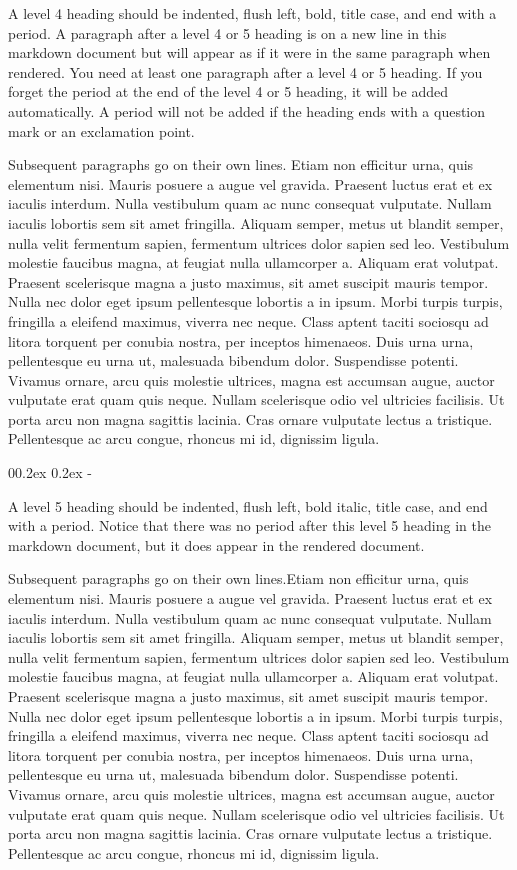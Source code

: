 \documentclass[
  man,
  floatsintext,
  longtable,
  nolmodern,
  notxfonts,
  notimes,
  mask,
  colorlinks=true,linkcolor=blue,citecolor=blue,urlcolor=blue]{apa7}
\makeatletter
\renewcommand{\subparagraph}[1]{\@startsection{subparagraph}{5}{0.5em}%
	{0\baselineskip \@plus 0.2ex \@minus 0.2ex}%
	{-\z@\relax}%
	{\normalfont\normalsize\bfseries\itshape\hspace{\parindent}{#1}\textit{\addperi}}{\relax}}
\makeatother
\begin{document}
A level 4 heading should be indented, flush left, bold, title case, and
end with a period. A paragraph after a level 4 or 5 heading is on a new
line in this markdown document but will appear as if it were in the same
paragraph when rendered. You need at least one paragraph after a level 4
or 5 heading. If you forget the period at the end of the level 4 or 5
heading, it will be added automatically. A period will not be added if
the heading ends with a question mark or an exclamation point.

Subsequent paragraphs go on their own lines. Etiam non efficitur urna,
quis elementum nisi. Mauris posuere a augue vel gravida. Praesent luctus
erat et ex iaculis interdum. Nulla vestibulum quam ac nunc consequat
vulputate. Nullam iaculis lobortis sem sit amet fringilla. Aliquam
semper, metus ut blandit semper, nulla velit fermentum sapien, fermentum
ultrices dolor sapien sed leo. Vestibulum molestie faucibus magna, at
feugiat nulla ullamcorper a. Aliquam erat volutpat. Praesent scelerisque
magna a justo maximus, sit amet suscipit mauris tempor. Nulla nec dolor
eget ipsum pellentesque lobortis a in ipsum. Morbi turpis turpis,
fringilla a eleifend maximus, viverra nec neque. Class aptent taciti
sociosqu ad litora torquent per conubia nostra, per inceptos himenaeos.
Duis urna urna, pellentesque eu urna ut, malesuada bibendum dolor.
Suspendisse potenti. Vivamus ornare, arcu quis molestie ultrices, magna
est accumsan augue, auctor vulputate erat quam quis neque. Nullam
scelerisque odio vel ultricies facilisis. Ut porta arcu non magna
sagittis lacinia. Cras ornare vulputate lectus a tristique. Pellentesque
ac arcu congue, rhoncus mi id, dignissim ligula.

\subparagraph{Level 5 Heading.}\label{level-5-heading}

A level 5 heading should be indented, flush left, bold italic, title
case, and end with a period. Notice that there was no period after this
level 5 heading in the markdown document, but it does appear in the
rendered document.

Subsequent paragraphs go on their own lines.Etiam non efficitur urna,
quis elementum nisi. Mauris posuere a augue vel gravida. Praesent luctus
erat et ex iaculis interdum. Nulla vestibulum quam ac nunc consequat
vulputate. Nullam iaculis lobortis sem sit amet fringilla. Aliquam
semper, metus ut blandit semper, nulla velit fermentum sapien, fermentum
ultrices dolor sapien sed leo. Vestibulum molestie faucibus magna, at
feugiat nulla ullamcorper a. Aliquam erat volutpat. Praesent scelerisque
magna a justo maximus, sit amet suscipit mauris tempor. Nulla nec dolor
eget ipsum pellentesque lobortis a in ipsum. Morbi turpis turpis,
fringilla a eleifend maximus, viverra nec neque. Class aptent taciti
sociosqu ad litora torquent per conubia nostra, per inceptos himenaeos.
Duis urna urna, pellentesque eu urna ut, malesuada bibendum dolor.
Suspendisse potenti. Vivamus ornare, arcu quis molestie ultrices, magna
est accumsan augue, auctor vulputate erat quam quis neque. Nullam
scelerisque odio vel ultricies facilisis. Ut porta arcu non magna
sagittis lacinia. Cras ornare vulputate lectus a tristique. Pellentesque
ac arcu congue, rhoncus mi id, dignissim ligula.
\end{document}
